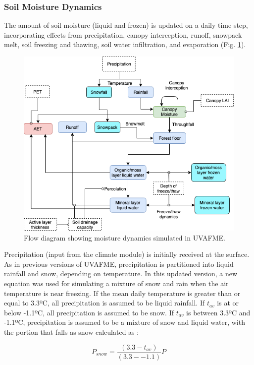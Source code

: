 \documentclass[a4paper, 12pt] {report}
\begin{document}
\subsubsection{Soil Moisture Dynamics}

The amount of soil moisture (liquid and frozen) is updated on a daily time step, incorporating effects from precipitation, canopy interception, runoff, snowpack melt, soil freezing and thawing, soil water infiltration, and evaporation (Fig. \ref{fig:soildiagram}).

\begin{figure}
  \includegraphics[width=0.8\linewidth]{Figures/SoilMoisture.png}
  \caption{Flow diagram showing moisture dynamics simulated in UVAFME.}
  \label{fig:soildiagram}
\end{figure} 

 Precipitation (input from the climate module) is initially received at the surface. As in previous versions of UVAFME, precipitation is partitioned into liquid rainfall and snow, depending on temperature. In this updated version, a new equation was used for simulating a mixture of snow and rain when the air temperature is near freezing. If the mean daily temperature is greater than or equal to 3.3ºC, all precipitation is assumed to be liquid rainfall. If $t_{av}$ is at or below -1.1ºC, all precipitation is assumed to be snow. If $t_{av}$ is between 3.3ºC and -1.1ºC, precipitation is assumed to be a mixture of snow and liquid water, with the portion  that falls as snow calculated as :

\begin{equation}
P_{snow} = \frac{(3.3 - t_{av})}{(3.3 - -1.1)}P 
\end{equation}
\end{document}
